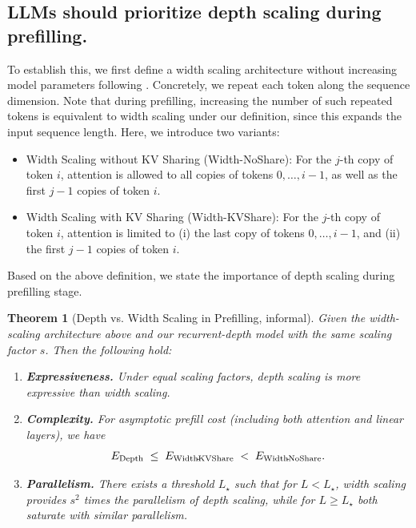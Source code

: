 \documentclass{article} %
\newtheorem{theorem}{Theorem}[section]
\theoremstyle{definition}
\theoremstyle{plain}
\begin{document}
\subsection{LLMs should prioritize depth scaling during prefilling.}

To establish this, we first define a width scaling architecture without increasing model parameters following \cite{wu2025efficient}.  Concretely, we repeat each token along the sequence dimension. Note that during prefilling, increasing the number of such repeated tokens is equivalent to width scaling under our definition, since this expands the input sequence length. Here, we introduce two variants:
\begin{itemize}
[itemsep=0.0pt,topsep=0pt,leftmargin=*]
\item Width Scaling without KV Sharing (Width-NoShare): For the $j$-th copy of token $i$, attention is allowed to all copies of tokens $0,\dots,i-1$, as well as the first $j-1$ copies of token $i$.
\item Width Scaling with KV Sharing (Width-KVShare): For the $j$-th copy of token $i$, attention is limited to (i) the last copy of tokens $0,\dots,i-1$, and (ii) the first $j-1$ copies of token $i$.
\end{itemize}

Based on the above definition, we state the importance of depth scaling during prefilling stage.

\begin{theorem}[Depth vs. Width Scaling in Prefilling, informal]
Given the width-scaling architecture above and our recurrent-depth model with the same scaling factor $s$. Then the following hold:
\begin{enumerate}[itemsep=2pt,topsep=0pt,leftmargin=*]
\item \textbf{Expressiveness.} Under equal scaling factors,  depth scaling is more expressive than width scaling.
\item \textbf{Complexity.} For asymptotic prefill cost (including both attention and linear layers), we have
\[
E_{\textnormal{Depth}} \;\leq\; E_{\textnormal{Width\!-\!KVShare}} \;<\; E_{\textnormal{Width\!-\!NoShare}}.
\]
\item \textbf{Parallelism.} There exists a threshold $L_\star$ such that for $L<L_\star$, width scaling provides $s^{2}$ times the parallelism of depth scaling, while for $L\geq L_\star$ both saturate with similar parallelism. 
\end{enumerate}
\end{theorem}
\end{document}
